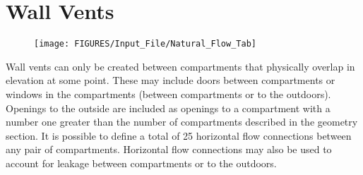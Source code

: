 \section{Wall Vents}

\begin{figure}[h!]
\begin{center}
\texttt{[image: FIGURES/Input\_File/Natural\_Flow\_Tab]}
\end{center}
\end{figure}

Wall vents can only be created between compartments that physically overlap in elevation at some point. These may include doors between compartments or windows in the compartments (between compartments or to the outdoors).  Openings to the outside are included as openings to a compartment with a number one greater than the number of compartments described in the geometry section. It is possible to define a total of 25 horizontal flow connections between any pair of compartments. Horizontal flow connections may also be used to account for leakage between compartments or to the outdoors.

